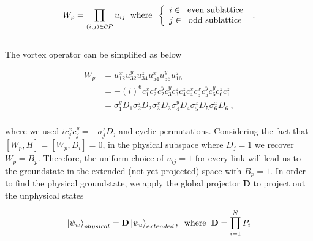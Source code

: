 \documentclass{article}
\begin{document}
\begin{equation}\label{eq:26}
	\begin{aligned}
		W_p = \prod_{(i,j)\in \partial P} u_{ij} \hspace{2mm}\text{where}\hspace{2mm}
		\left\{
		\begin{array}{l}
            i  \in \hspace{2mm} \text{even sublattice} \\
            j  \in \hspace{2mm} \text{odd sublattice}
        \end{array}
        \right.~.
	\end{aligned}
\end{equation}\\

The vortex operator can be simplified as below

\begin{equation}\label{eq:27}
	\begin{aligned}
		W_p &= u^x_{12}u^y_{32}u^z_{34}u^x_{54}u^y_{56}u^z_{16} \\
		&= -(i)^6 c^x_1 c^x_2 c^y_2 c^y_3 c^z_3 c^z_4 c^x_4 c^x_5 c^y_5 c^y_6 c^z_6 c^z_1 \\
		&= \sigma^y_1 D_1 \sigma^z_2 D_2 \sigma^x_3 D_3 \sigma^y_4 D_4 \sigma^z_5 D_5 \sigma^x_6 D_6 ~,
	\end{aligned}
\end{equation}\\

where we used $i c^x_j c^y_j = -\sigma^z_j D_j$ and cyclic permutations. Considering the fact that $[W_p, H] = [W_p, D_i] = 0$, in the physical subspace where $D_j = 1$ we recover $W_p = B_p$. Therefore, the uniform choice of $u_{ij}=1$ for every link will lead us to the groundstate in the extended (not yet projected) space with $B_p = 1$. In order to find the physical groundstate, we apply the global projector $\mathbf{D}$ to project out the unphysical states

\begin{equation}\label{eq:28}
	\begin{aligned}
		\ket{\psi_w}_{physical} = \mathbf{D} \ket{\psi_u}_{extended},  \hspace{2mm}\text{where}\hspace{2mm} \mathbf{D} = \prod^N_{i=1} P_i
		\end{aligned}
\end{equation}\\
\end{document}
